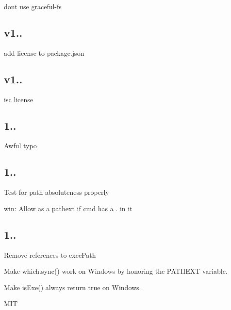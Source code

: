 \begin{DoxyItemize}
\item don\textquotesingle{}t use graceful-\/fs
\end{DoxyItemize}

\subsection*{v1..}


\begin{DoxyItemize}
\item add license to package.\+json
\end{DoxyItemize}

\subsection*{v1..}


\begin{DoxyItemize}
\item isc license
\end{DoxyItemize}

\subsection*{1..}


\begin{DoxyItemize}
\item Awful typo
\end{DoxyItemize}

\subsection*{1..}


\begin{DoxyItemize}
\item Test for path absoluteness properly
\item win\+: Allow \textquotesingle{}\textquotesingle{} as a pathext if cmd has a . in it
\end{DoxyItemize}

\subsection*{1..}


\begin{DoxyItemize}
\item Remove references to exec\+Path
\item Make {\ttfamily which.\+sync()} work on Windows by honoring the P\+A\+T\+H\+E\+XT variable.
\item Make {\ttfamily is\+Exe()} always return true on Windows.
\item M\+IT
\end{DoxyItemize}

